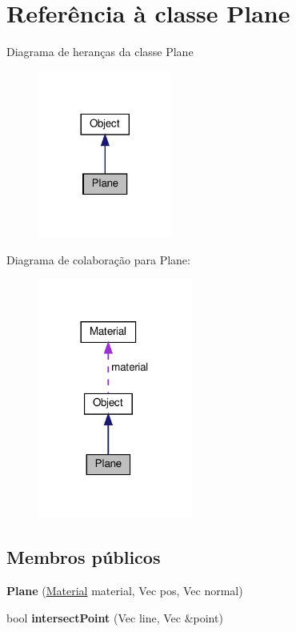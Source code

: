 \hypertarget{classPlane}{}\section{Referência à classe Plane}
\label{classPlane}


Diagrama de heranças da classe Plane\nopagebreak
\begin{figure}[H]
\begin{center}
\leavevmode
\includegraphics[width=125pt]{classPlane__inherit__graph}
\end{center}
\end{figure}


Diagrama de colaboração para Plane\+:\nopagebreak
\begin{figure}[H]
\begin{center}
\leavevmode
\includegraphics[width=144pt]{classPlane__coll__graph}
\end{center}
\end{figure}
\subsection*{Membros públicos}
\begin{DoxyCompactItemize}
\item 
\mbox{\label{classPlane_a93e27a016a79fc07802a495e26737797}} 
{\bfseries Plane} (\hyperlink{classMaterial}{Material} material, Vec pos, Vec normal)
\item 
\mbox{\label{classPlane_a0458915a12d387dedf4e6cc723ef19f4}} 
bool {\bfseries intersect\+Point} (Vec line, Vec \&point)
\end{DoxyCompactItemize}
